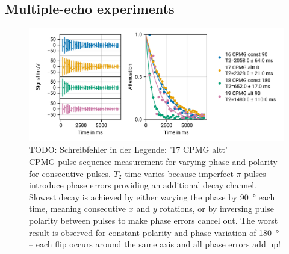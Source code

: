 \documentclass[
    parskip=half, 
    twoside=false,
    twocolumn=true,
    fontsize=11pt,
]{scrarticle}
\begin{document}


\subsection{Multiple-echo experiments}
\begin{figure}
    \centering
    \includegraphics{figures/05 CPMG.pdf}
    \caption{TODO: Schreibfehler in der Legende: '17 CPMG altt'\\ CPMG pulse sequence measurement for varying phase and polarity for consecutive pulses. $T_2$ time varies because imperfect $\pi$ pulses introduce phase errors providing an additional decay channel. Slowest decay is achieved by either varying the phase by \SI{90}{\degree} each time, meaning consecutive $x$ and $y$ rotations, or by inversing pulse polarity between pulses to make phase errors cancel out. The worst result is observed for constant polarity and phase variation of \SI{180}{\degree} -- each flip occurs around the same axis and all phase errors add up!}
    \label{fig:CPMG}
\end{figure}
\end{document}
